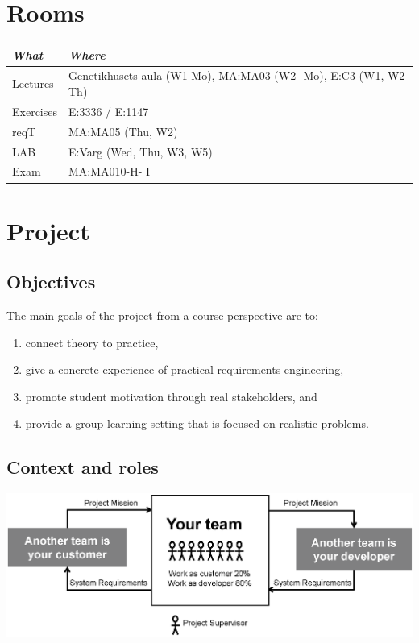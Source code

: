 \documentclass[10pt,a4paper]{article}
\begin{document}
\section{Rooms}
\begin{flushleft}
\small
\begin{tabular}{l | l } 
{\it What} & {\it Where} \\
\hline
Lectures & Genetikhusets aula (W1 Mo), MA:MA03 (W2- Mo), E:C3 (W1, W2 Th) \\
Exercises & E:3336 / E:1147 \\
reqT & MA:MA05 (Thu, W2)   \\
LAB & E:Varg (Wed, Thu, W3, W5)\\
Exam & MA:MA010-H- I \\
\end{tabular}
\end{flushleft}
\newpage
\section{Project}
\subsection{Objectives}
The main goals of the project from a course perspective are to:
\begin{enumerate}[noitemsep]
\item connect theory to practice,
\item give a concrete experience of practical requirements engineering,
\item promote student motivation through real stakeholders, and
\item provide a group-learning setting that is focused on realistic problems.
\end{enumerate}


\subsection{Context and roles}
\includegraphics[scale=0.45]{fig/project-roles.eps}
%
\begin{figure}[h]
\centering%
\vskip-1.5cm
\hskip-2.9cm
\vskip0.7cm
\end{figure}
\end{document}
